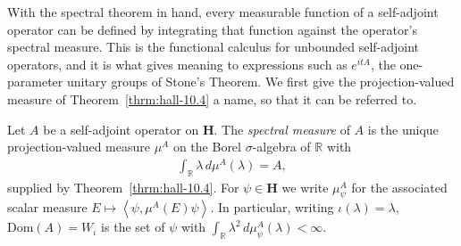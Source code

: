 With the spectral theorem in hand, every measurable function of a self-adjoint operator can be defined by integrating that function against the operator's spectral measure. This is the functional calculus for unbounded self-adjoint operators, and it is what gives meaning to expressions such as $e^{itA}$, the one-parameter unitary groups of Stone's Theorem. We first give the projection-valued measure of Theorem~\ref{thrm:hall-10.4} a name, so that it can be referred to.

\begin{definition}
    \label{def:spectral-measure}
    \leanok
    Let $A$ be a self-adjoint operator on $\mathbf{H}$. The \textit{spectral measure} of $A$ is the unique projection-valued measure $\mu^A$ on the Borel $\sigma$-algebra of $\mathbb{R}$ with
    \begin{align}
        \int_{\mathbb{R}} \lambda \, d\mu^A(\lambda) = A,
    \end{align}
    supplied by Theorem~\ref{thrm:hall-10.4}. For $\psi \in \mathbf{H}$ we write $\mu^A_\psi$ for the associated scalar measure $E \mapsto \left< \psi, \mu^A(E)\psi \right>$. In particular, writing $\iota(\lambda) = \lambda$, $\text{Dom}(A) = W_\iota$ is the set of $\psi$ with $\int_{\mathbb{R}} \lambda^2 \, d\mu^A_\psi(\lambda) < \infty$.
\end{definition}

